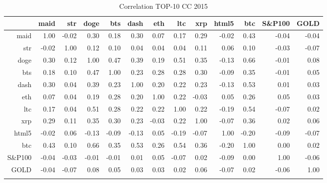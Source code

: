 \begin{table}[ht]
\centering
\begin{tabular}{rrrrrrrrrrrrr}
  \hline
 & maid & str & doge & bts & dash & eth & ltc & xrp & html5 & btc & S\&P100 & GOLD \\ 
  \hline
maid & 1.00 & -0.02 & 0.30 & 0.18 & 0.30 & 0.07 & 0.17 & 0.29 & -0.02 & 0.43 & -0.04 & -0.04 \\ 
  str & -0.02 & 1.00 & 0.12 & 0.10 & 0.04 & 0.04 & 0.04 & 0.11 & 0.06 & 0.10 & -0.03 & -0.07 \\ 
  doge & 0.30 & 0.12 & 1.00 & 0.47 & 0.39 & 0.19 & 0.51 & 0.35 & -0.13 & 0.66 & -0.01 & 0.08 \\ 
  bts & 0.18 & 0.10 & 0.47 & 1.00 & 0.23 & 0.28 & 0.28 & 0.30 & -0.09 & 0.35 & -0.01 & 0.05 \\ 
  dash & 0.30 & 0.04 & 0.39 & 0.23 & 1.00 & 0.20 & 0.22 & 0.23 & -0.13 & 0.53 & 0.01 & 0.03 \\ 
  eth & 0.07 & 0.04 & 0.19 & 0.28 & 0.20 & 1.00 & 0.22 & -0.03 & 0.05 & 0.26 & 0.05 & 0.03 \\ 
  ltc & 0.17 & 0.04 & 0.51 & 0.28 & 0.22 & 0.22 & 1.00 & 0.22 & -0.19 & 0.54 & -0.07 & 0.02 \\ 
  xrp & 0.29 & 0.11 & 0.35 & 0.30 & 0.23 & -0.03 & 0.22 & 1.00 & -0.07 & 0.36 & 0.02 & 0.06 \\ 
  html5 & -0.02 & 0.06 & -0.13 & -0.09 & -0.13 & 0.05 & -0.19 & -0.07 & 1.00 & -0.20 & -0.09 & -0.07 \\ 
  btc & 0.43 & 0.10 & 0.66 & 0.35 & 0.53 & 0.26 & 0.54 & 0.36 & -0.20 & 1.00 & 0.00 & 0.02 \\ 
  S\&P100 & -0.04 & -0.03 & -0.01 & -0.01 & 0.01 & 0.05 & -0.07 & 0.02 & -0.09 & 0.00 & 1.00 & -0.06 \\ 
  GOLD & -0.04 & -0.07 & 0.08 & 0.05 & 0.03 & 0.03 & 0.02 & 0.06 & -0.07 & 0.02 & -0.06 & 1.00 \\ 
   \hline
      \caption{Correlation TOP-10 CC 2015}
\end{tabular}
\end{table}

